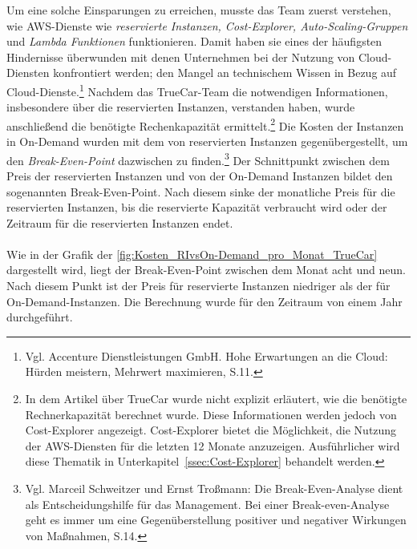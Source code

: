 Um eine solche Einsparungen zu erreichen, musste das Team zuerst verstehen, wie AWS-Dienste wie \textit{reservierte Instanzen, Cost-Explorer, Auto-Scaling-Gruppen} und \textit{Lambda Funktionen} funktionieren. Damit haben sie eines der häufigsten Hindernisse überwunden mit denen Unternehmen bei der Nutzung von Cloud-Diensten konfrontiert werden; den Mangel an technischem Wissen in Bezug auf Cloud-Dienste.\footnote{Vgl. Accenture Dienstleistungen GmbH. Hohe Erwartungen an die Cloud: Hürden meistern, Mehrwert maximieren, S.11\cite{ACC1}.} Nachdem das TrueCar-Team die notwendigen Informationen, insbesondere über die reservierten Instanzen, verstanden haben, wurde anschließend die benötigte Rechenkapazität ermittelt.\footnote{In dem Artikel über TrueCar wurde nicht explizit erläutert, wie die benötigte Rechnerkapazität berechnet wurde. Diese Informationen werden jedoch von Cost-Explorer angezeigt. Cost-Explorer bietet die Möglichkeit, die Nutzung der AWS-Diensten für die letzten 12 Monate anzuzeigen. Ausführlicher wird diese Thematik in Unterkapitel~\ref{ssec:Cost-Explorer} behandelt werden.} Die Kosten der Instanzen in On-Demand wurden mit dem von reservierten Instanzen gegenübergestellt, um den \textit{Break-Even-Point} dazwischen zu finden.\footnote{Vgl. Marceil Schweitzer und Ernst Troßmann: Die Break-Even-Analyse dient als Entscheidungshilfe für das Management. Bei einer Break-even-Analyse geht es immer um eine Gegenüberstellung positiver und negativer Wirkungen von Maßnahmen, S.14.\cite{BEA}} Der Schnittpunkt zwischen dem Preis der reservierten Instanzen und von der On-Demand Instanzen bildet den sogenannten Break-Even-Point.
Nach diesem sinke der monatliche Preis für die reservierten Instanzen, bis die reservierte Kapazität verbraucht wird oder der Zeitraum für die reservierten Instanzen endet.
\\\\
Wie in der Grafik der \autoref{fig:Kosten_RIvsOn-Demand_pro_Monat_TrueCar} dargestellt wird, liegt der Break-Even-Point zwischen dem Monat acht und neun. Nach diesem Punkt ist der Preis für reservierte Instanzen niedriger als der für On-Demand-Instanzen. Die Berechnung wurde für den Zeitraum von einem Jahr durchgeführt. %
